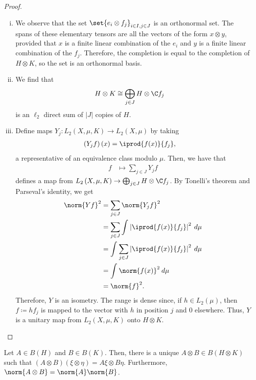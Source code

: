 \documentclass[10pt]{mypackage}
\renewcommand{\coloneq}{\coloneqq}
\begin{document}
\begin{proof}\hfill
  \begin{enumerate}[(i)]
    \item We observe that the set $\set{e_i\otimes f_j}_{i\in I,j\in J}$ is an orthonormal set. The spans of these elementary tensors are all the vectors of the form $x\otimes y$, provided that $x$ is a finite linear combination of the $e_i$ and $y$ is a finite linear combination of the $f_j$. Therefore, the completion is equal to the completion of $H\otimes K$, so the set is an orthonormal basis.
    \item We find that
      \begin{align*}
        H\otimes K &\cong \bigoplus_{j\in J} H\otimes \C f_j
      \end{align*}
      is an $\ell_2$ direct sum of $\left\vert J \right\vert$ copies of $H$.
    \item Define maps $Y_j\colon L_2\left( X,\mu,K \right)\rightarrow L_2\left( X,\mu \right)$ by taking
      \begin{align*}
        \left( Y_jf \right)(x) &= \iprod{f(x)}{f_j},
      \end{align*}
      a representative of an equivalence class modulo $\mu$. Then, we have that
      \begin{align*}
        f &\mapsto \sum_{j\in J}Y_jf
      \end{align*}
      defines a map from $L_2\left( X,\mu,K \right)\rightarrow \bigoplus_{j\in J}H\otimes \C f_j$. By Tonelli's theorem and Parseval's identity, we get
      \begin{align*}
        \norm{Yf}^2 &= \sum_{j\in J}\norm{Y_jf}^2\\
                    &= \sum_{j\in J} \int_{}^{} \left\vert \iprod{f(x)}{f_j} \right\vert^2\:d\mu\\
                    &= \int_{}^{} \sum_{j\in J} \left\vert \iprod{f(x)}{f_j} \right\vert^2\:d\mu\\
                    &= \int_{}^{} \norm{f(x)}^2\:d\mu\\
                    &= \norm{f}^2.
      \end{align*}
      Therefore, $Y$ is an isometry. The range is dense since, if $h\in L_2\left( \mu \right)$, then $f\coloneq hf_j$ is mapped to the vector with $h$ in position $j$ and $0$ elsewhere. Thus, $Y$ is a unitary map from $L_2\left( X,\mu,K \right)$ onto $H\otimes K$.
  \end{enumerate}
\end{proof}
\begin{proposition}
  Let $A\in B(H)$ and $B\in B(K)$. Then, there is a unique $A\otimes B\in B\left( H\otimes K \right)$ such that $\left( A\otimes B \right)\left( \xi\otimes \eta \right) = A\xi\otimes B\eta$. Furthermore, $\norm{A\otimes B} = \norm{A}\norm{B}$.
\end{proposition}
\end{document}

